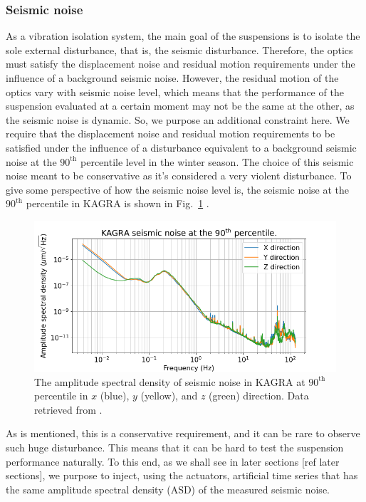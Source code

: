 \subsubsection{Seismic noise}
As a vibration isolation system, the main goal of the suspensions is to isolate the sole external disturbance, that is, the seismic disturbance.
Therefore, the optics must satisfy the displacement noise and residual motion requirements under the influence of a background seismic noise.
However, the residual motion of the optics vary with seismic noise level, which means that the performance of the suspension evaluated at a certain moment may not be the same at the other, as the seismic noise is dynamic.
So, we purpose an additional constraint here.
We require that the displacement noise and residual motion requirements to be satisfied under the influence of a disturbance equivalent to a background seismic noise at the $90^\mathrm{th}$ percentile level in the winter season.
The choice of this seismic noise meant to be conservative as it's considered a very violent disturbance.
To give some perspective of how the seismic noise level is, the seismic noise at the $90^\mathrm{th}$ percentile in KAGRA is shown in Fig.~\ref{fig:kagra_seismic_noise_90th_percentile} \cite{seismic_noise_kagra}.
\begin{figure}[!h]
	\centering
	\includegraphics[width=0.7\linewidth]{figures/kagra_seismic_noise_90th_percentile.png}
	\caption{The amplitude spectral density of seismic noise in KAGRA at $90^\mathrm{th}$ percentile in $x$ (blue), $y$ (yellow), and $z$ (green) direction. Data retrieved from \cite{seismic_noise_kagra}.}
	\label{fig:kagra_seismic_noise_90th_percentile}
\end{figure}
As is mentioned, this is a conservative requirement, and it can be rare to observe such huge disturbance.
This means that it can be hard to test the suspension performance naturally.
To this end, as we shall see in later sections [ref later sections], we purpose to inject, using the actuators, artificial time series that has the same amplitude spectral density (ASD) of the measured seismic noise.

